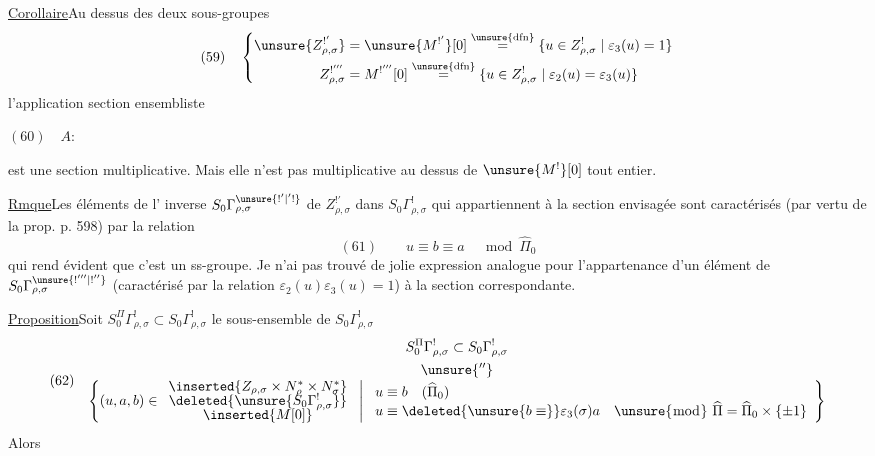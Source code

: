 \uline{Corollaire}\quad Au dessus des deux sous-groupes
\[
(59)\quad\left\{\begin{aligned}
\unsure{Z_{\rho,\sigma}^{!'}}&=\unsure{M^{!'}}[0]
\overset{\unsure{\mathrm{dfn}}}{=}
\{u\in Z_{\rho,\sigma}^{!}\mid\varepsilon_3(u)=1\}\\
Z_{\rho,\sigma}^{!'''}&=M^{!'''}[0]
\overset{\unsure{\mathrm{dfn}}}{=}
\{u\in Z_{\rho,\sigma}^{!}\mid\varepsilon_2(u)=\varepsilon_3(u)\}
\end{aligned}\right.
\]
l'application section ensembliste

$(60)\quad A:$

est une section multiplicative. Mais elle n'est pas multiplicative au
dessus de $\unsure{M^{!}}[0]$ tout entier.

\uline{Rmque}\quad Les éléments de l' inverse
$S_0\Gamma_{\rho,\sigma}^{\unsure{!'|'!}}$ de $Z_{\rho,\sigma}^{!'}$
dans $S_0\Gamma_{\rho,\sigma}^{!}$ qui appartiennent à la section envisagée
sont caractérisés (par vertu de la prop. p. 598) par la relation
\[
(61)\qquad u\equiv b\equiv a\quad\bmod\widehat\Pi_0
\]
qui rend évident que c'est un ss-groupe.
Je n'ai pas trouvé de jolie expression analogue pour l'appartenance d'un
élément de $S_0\Gamma_{\rho,\sigma}^{\unsure{!'''|!''}}$
(caractérisé par la relation $\varepsilon_2(u)\varepsilon_3(u)=1$)
à la section correspondante.

\uline{Proposition}\quad Soit
$S_0^\Pi\Gamma_{\rho,\sigma}^{!}\subset S_0\Gamma_{\rho,\sigma}^{!}$
le sous-ensemble de $S_0\Gamma_{\rho,\sigma}^{!}$
\[
(62)\quad
\begin{gathered}
S_0^\Pi\Gamma_{\rho,\sigma}^{!}\subset S_0\Gamma_{\rho,\sigma}^{!}\\
\unsure{''}\\[-1ex]
\left\{(u,a,b)\in
\begin{array}{c}
\inserted{Z_{\rho,\sigma}\times N_\rho^*\times N_\sigma^*}\\[-.5ex]
\deleted{\unsure{S_0\Gamma_{\rho,\sigma}^{!}}}\\[-.5ex]
\inserted{M[0]}
\end{array}
\ \middle|\ 
\begin{array}{l}
u\equiv b\quad(\widehat\Pi_0)\\
u\equiv\deleted{\unsure{b\equiv}}\varepsilon_3(\sigma)a\quad
\unsure{\bmod}\ \widehat\Pi=\widehat\Pi_0\times\{\pm1\}
\end{array}
\right\}
\end{gathered}
\]
Alors

